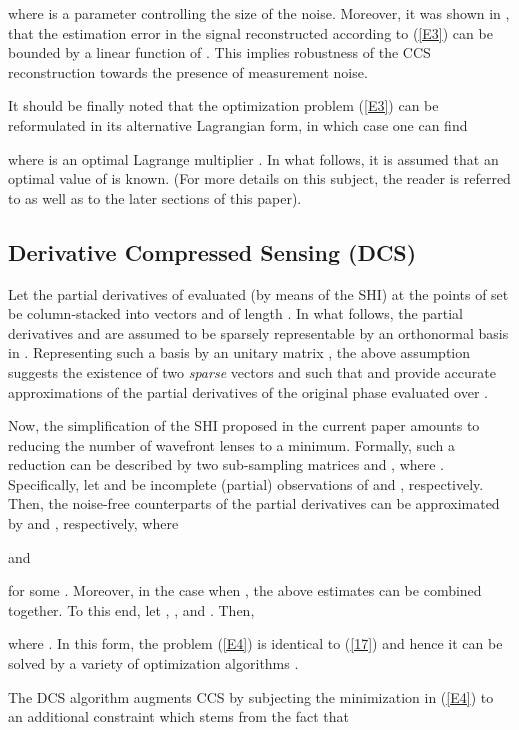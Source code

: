 \pdfoutput=1 \documentclass[journal]{IEEEtran}
\begin{document}
where  is a parameter controlling the size of the noise. Moreover, it was shown in \cite{4, 13}, that the estimation error in the signal reconstructed according to (\ref{E3}) can be bounded by a linear function of . This implies robustness of the CCS reconstruction towards the presence of measurement noise.

It should be finally noted that the optimization problem (\ref{E3}) can be reformulated in its alternative Lagrangian form, in which case one can find

where  is an optimal Lagrange multiplier \cite{20}. In what follows, it is assumed that an optimal value of  is known. (For more details on this subject, the reader is referred to \cite{20} as well as to the later sections of this paper).

\subsection{Derivative Compressed Sensing (DCS)}
Let the partial derivatives of  evaluated (by means of the SHI) at the points of set  be column-stacked into vectors  and  of length .  In what follows, the partial derivatives  and  are assumed to be sparsely representable by an orthonormal basis in . Representing such a basis by an  unitary matrix , the above assumption suggests the existence of two {\em sparse} vectors  and  such that  and  provide accurate approximations of the partial derivatives of the original phase  evaluated over .

Now, the simplification of the SHI proposed in the current paper amounts to reducing the number of wavefront lenses to a minimum. Formally, such a reduction can be described by two  sub-sampling matrices  and , where . Specifically, let  and  be incomplete (partial) observations of  and , respectively. Then, the noise-free counterparts of the partial derivatives can be approximated by  and , respectively, where

and

for some . Moreover, in the case when , the above estimates can be combined together. To this end, let , , and . Then,

where . In this form, the problem (\ref{E4}) is identical to (\ref{17}) and hence it can be solved by a variety of optimization algorithms \cite{20, 21}.

The DCS algorithm augments CCS by subjecting the minimization in (\ref{E4}) to an additional constraint which stems from the fact that \cite{14}
\end{document}
